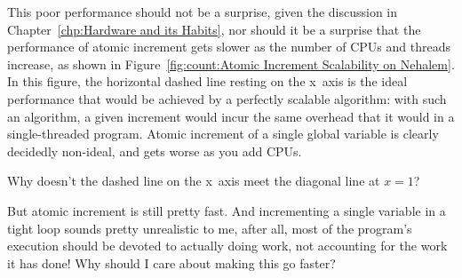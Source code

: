 This poor performance should not be a surprise, given the discussion in
Chapter~\ref{chp:Hardware and its Habits},
nor should it be a surprise that the performance of atomic increment
gets slower as the number of CPUs and threads increase, as shown in
Figure~\ref{fig:count:Atomic Increment Scalability on Nehalem}.
In this figure, the horizontal dashed line resting on the x~axis
is the ideal performance that would be achieved
by a perfectly scalable algorithm: with such an algorithm, a given
increment would incur the same overhead that it would in a single-threaded
program.
Atomic increment of a single global variable is clearly
decidedly non-ideal, and gets worse as you add CPUs.

\QuickQuiz{}
	Why doesn't the dashed line on the x~axis meet the 
	diagonal line at $x=1$?
 \QuickQuizEnd

\QuickQuiz{}
	But atomic increment is still pretty fast.
	And incrementing a single variable in a tight loop sounds
	pretty unrealistic to me, after all, most of the program's
	execution should be devoted to actually doing work, not accounting
	for the work it has done!
	Why should I care about making this go faster?
 \QuickQuizEnd

